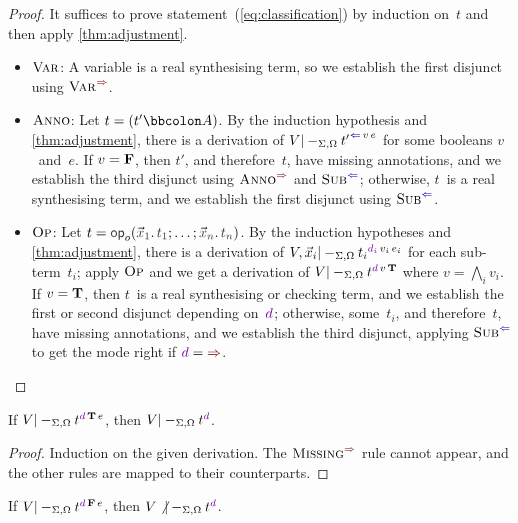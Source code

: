 \begin{proof}
It suffices to prove statement~(\ref{eq:classification}) by induction on~$t$ and then apply \cref{thm:adjustment}.
\begin{itemize}
\item $\textnormal{\textsc{Var}}$:
A variable is a real synthesising term, so we establish the first disjunct using $\SynRule{Var}$.
\item $\textnormal{\textsc{Anno}}$:
Let $t = (t' \bbcolon A)$.
By the induction hypothesis and \cref{thm:adjustment}, there is a derivation of $V |-_{\Sigma,\Omega} {t'}^{\chk\,v\,e}$ for some booleans $v$~and~$e$.
If $v = \mathbf{F}$, then $t'$, and therefore~$t$, have missing annotations, and we establish the third disjunct using $\SynRule{Anno}$ and $\ChkRule{Sub}$; otherwise, $t$~is a real synthesising term, and we establish the first disjunct using $\ChkRule{Sub}$.
\item $\textnormal{\textsc{Op}}$:
Let $t = \tmOpts$.
By the induction hypotheses and \cref{thm:adjustment}, there is a derivation of $V, \vec x_i |-_{\Sigma,\Omega} {t_i}^{\dir{d_i}\,v_i\,e_i}$ for each sub-term~$t_i$; apply $\textnormal{\textsc{Op}}$ and we get a derivation of $V |-_{\Sigma,\Omega} t^{\dir d\,v\,\True}$ where $v = \bigwedge_i v_i$.
If $v = \mathbf{T}$, then $t$~is a real synthesising or checking term, and we establish the first or second disjunct depending on~$\dir d$; otherwise, some~$t_i$, and therefore~$t$, have missing annotations, and we establish the third disjunct, applying $\ChkRule{Sub}$ to get the mode right if $\dir d = {\syn}$.
\vspace{-\topsep-\baselineskip}
\end{itemize}
\end{proof}


\begin{lemma}\label{thm:Pre?-true}
If\/ $V |-_{\Sigma,\Omega} t^{\dir{d}\,\True\,e}$, then $V |-_{\Sigma,\Omega} t^\dir{d}$.
\end{lemma}

\begin{proof}
Induction on the given derivation.
The $\SynRule{Missing}$ rule cannot appear, and the other rules are mapped to their counterparts.
\end{proof}

\begin{lemma}\label{thm:Pre?-false}
If\/ $V |-_{\Sigma,\Omega} t^{\dir{d}\,\False\,e}$, then $V \not|-_{\Sigma,\Omega} t^\dir{d}$.
\end{lemma}

